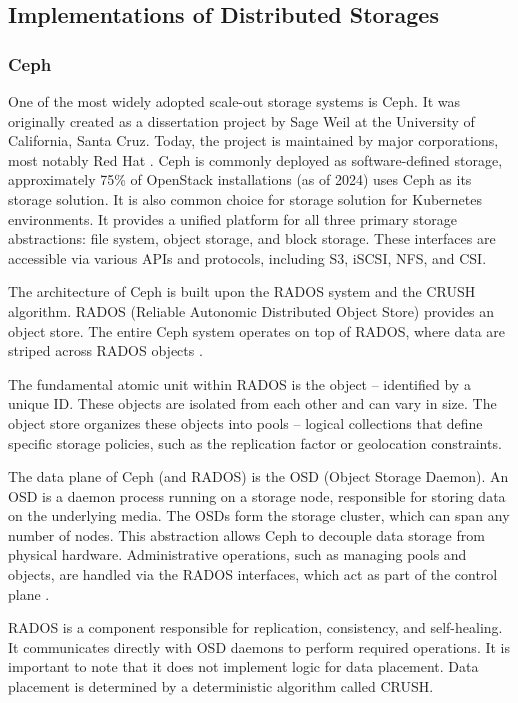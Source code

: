 \vspace{1.5em}

\subsection{Implementations of Distributed Storages}\label{sec:dfs_implementations}
\subsubsection{Ceph}\label{sec:ceph}
One of the most widely adopted scale-out storage systems is Ceph. It was originally created as a dissertation project by Sage Weil at the University of California, Santa Cruz. Today, the project is maintained by major corporations, most notably Red Hat \cite{vondra_storage_2022}. Ceph is commonly deployed as software-defined storage, approximately 75\%\cite{openstack_team_openstack_2025} of OpenStack installations (as of 2024) uses Ceph as its storage solution. It is also common choice for storage solution for Kubernetes environments. It provides a unified platform for all three primary storage abstractions: file system, object storage, and block storage. These interfaces are accessible via various APIs and protocols, including S3, iSCSI, NFS, and CSI.

The architecture of Ceph is built upon the RADOS system and the CRUSH algorithm. RADOS (Reliable Autonomic Distributed Object Store) provides an object store. The entire Ceph system operates on top of RADOS, where data are striped across RADOS objects \cite{cubefs_authors_cubefs_nodate}.

The fundamental atomic unit within RADOS is the object -- identified by a unique ID. These objects are isolated from each other and can vary in size. The object store organizes these objects into pools -- logical collections that define specific storage policies, such as the replication factor or geolocation constraints. 

The data plane of Ceph (and RADOS) is the OSD (Object Storage Daemon). An OSD is a daemon process running on a storage node, responsible for storing data on the underlying media. The OSDs form the storage cluster, which can span any number of nodes. This abstraction allows Ceph to decouple data storage from physical hardware. Administrative operations, such as managing pools and objects, are handled via the RADOS interfaces, which act as part of the control plane \cite{ceph_authors_cephio_2009}.

RADOS is a component responsible for replication, consistency, and self-healing. It communicates directly with OSD daemons to perform required operations. It is important to note that it does not implement logic for data placement. Data placement is determined by a deterministic algorithm called CRUSH.

